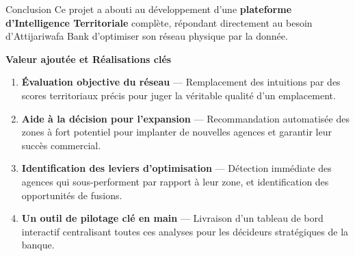 \documentclass[aspectratio=169, 9pt]{beamer}
\begin{document}
\begin{frame}{Conclusion}
  \vspace{0.1cm}
  Ce projet a abouti au développement d'une \textbf{plateforme d'Intelligence Territoriale} complète, répondant directement au besoin d'Attijariwafa Bank d'optimiser son réseau physique par la donnée.

  \vspace{0.3cm}
  {\color{AccentOrange}\faCheckCircle} \textbf{Valeur ajoutée et Réalisations clés}
  \begin{enumerate}
    \item \textbf{Évaluation objective du réseau} --- Remplacement des intuitions par des scores territoriaux précis pour juger la véritable qualité d'un emplacement.
    \vspace{0.2cm}
    \item \textbf{Aide à la décision pour l'expansion} --- Recommandation automatisée des zones à fort potentiel pour implanter de nouvelles agences et garantir leur succès commercial.
    \vspace{0.2cm}
    \item \textbf{Identification des leviers d'optimisation} --- Détection immédiate des agences qui sous-performent par rapport à leur zone, et identification des opportunités de fusions.
    \vspace{0.2cm}
    \item \textbf{Un outil de pilotage clé en main} --- Livraison d'un tableau de bord interactif centralisant toutes ces analyses pour les décideurs stratégiques de la banque.
  \end{enumerate}
\end{frame}
\end{document}
